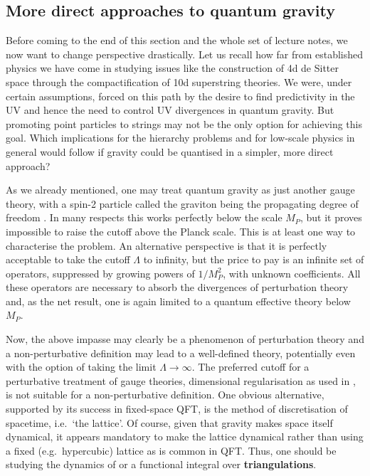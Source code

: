 \documentclass[12pt]{article}
\numberwithin{equation}{section}
\begin{document}
\subsection{More direct approaches to quantum gravity}
Before coming to the end of this section and the whole set of lecture notes, we now want to change perspective drastically. Let us recall how far from established physics we have come in studying issues like the construction of 4d de Sitter space through the compactification of 10d superstring theories. We were, under certain assumptions, forced on this path by the desire to find predictivity in the UV and hence the need to control UV divergences in quantum gravity. But promoting point particles to strings may not be the only option for achieving this goal. Which implications for the hierarchy problems and for low-scale physics in general would follow if gravity could be quantised in a simpler, more direct approach?

As we already mentioned, one may treat quantum gravity as just another gauge theory, with a spin-2 particle called the graviton being the propagating degree of freedom \cite{vel}. In many respects this works perfectly below the scale $M_P$, but it proves impossible to raise the cutoff above the Planck scale. This is at least one way to characterise the problem. An alternative perspective is that it is perfectly acceptable to take the cutoff $\Lambda$ to infinity, but the price to pay is an infinite set of operators, suppressed by growing powers of $1/M_P^2$, with unknown coefficients. All these operators are necessary to absorb the divergences of perturbation theory and, as the net result, one is again limited to a quantum effective theory below $M_P$.

Now, the above impasse may clearly be a phenomenon of perturbation theory and a non-perturbative definition may lead to a well-defined theory, potentially even with the option of taking the limit $\Lambda\to \infty$. The preferred cutoff for a perturbative treatment of gauge theories, dimensional regularisation as used in \cite{vel}, is not suitable for a non-perturbative definition. One obvious alternative, supported by its success in fixed-space QFT, is the method of discretisation of spacetime, i.e.~`the lattice'. Of course, given that gravity makes space itself dynamical, it appears mandatory to make the lattice dynamical rather than using a fixed (e.g.~hypercubic) lattice as is common in QFT. Thus, one should be studying the dynamics of or a functional integral over {\bf triangulations}.
\end{document}
